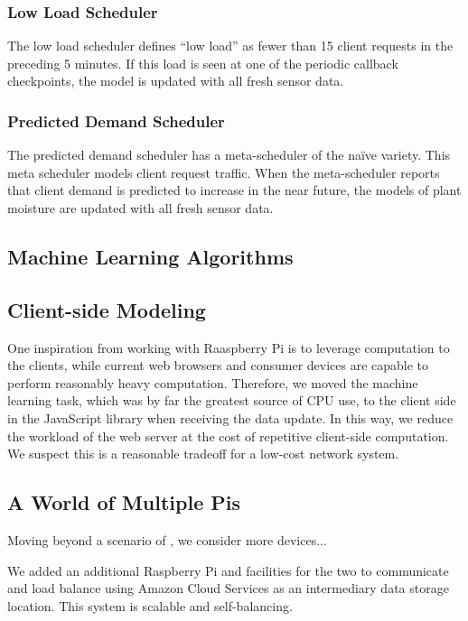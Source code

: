 \documentclass[a4paper]{acm_proc_article-sp}
\begin{document}
\subsubsection{Low Load Scheduler}

The low load scheduler defines ``low load'' as fewer than 15 client requests in the preceding 5 minutes.  If this load is seen at one of the periodic callback checkpoints, the model is updated with all fresh sensor data.

\subsubsection{Predicted Demand Scheduler}

The predicted demand scheduler has a meta-scheduler of the na\"{i}ve variety.  This meta scheduler models client request traffic.  When the meta-scheduler reports that client demand is predicted to increase in the near future, the models of plant moisture are updated with all fresh sensor data.

\subsection{Machine Learning Algorithms}

\subsection{Client-side Modeling}

One inspiration from working with Raaspberry Pi is to leverage computation to the clients, while current web browsers and consumer devices are capable to perform reasonably heavy computation. Therefore, we moved the machine learning task, which was by far the greatest source of CPU use, to the client side in the JavaScript library when receiving the data update. In this way, we reduce the workload of the web server at the cost of repetitive client-side computation. We suspect this is a reasonable tradeoff for a low-cost network system.

\subsection{A World of Multiple Pis}

Moving beyond a scenario of , we consider more devices...

We added an additional Raspberry Pi and facilities for the two to communicate and load balance using Amazon Cloud Services as an intermediary data storage location.  This system is scalable and self-balancing.
\end{document}
